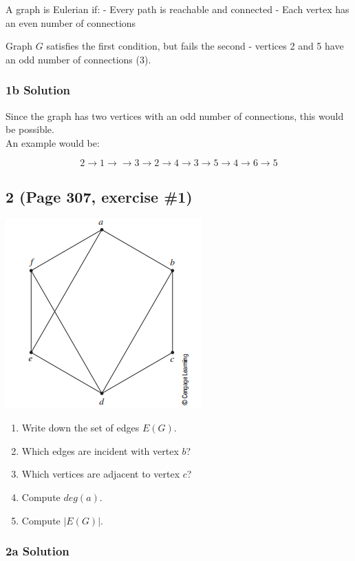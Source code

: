 \documentclass[]{article}
\begin{document}
A graph is Eulerian if: - Every path is reachable and connected - Each
vertex has an even number of connections

Graph \(G\) satisfies the first condition, but fails the second -
vertices 2 and 5 have an odd number of connections (3).

\hypertarget{b-solution}{%
\subsubsection{1b Solution}\label{b-solution}}

Since the graph has two vertices with an odd number of connections, this
would be possible.\\
An example would be:

\[
2 \to 1 \to \to 3 \to 2 \to 4 \to 3 \to 5 \to 4 \to 6 \to 5
\]

\hypertarget{page-307-exercise-1}{%
\subsection{2 (Page 307, exercise \#1)}\label{page-307-exercise-1}}

\includegraphics{figure811.png}

\begin{enumerate}
\def\labelenumi{\alph{enumi}.}
\item
  Write down the set of edges \(E(G)\).
\item
  Which edges are incident with vertex \(b\)?
\item
  Which vertices are adjacent to vertex \(c\)?
\item
  Compute \(deg(a)\).
\item
  Compute \(|E(G)|\).
\end{enumerate}

\hypertarget{a-solution-1}{%
\subsubsection{2a Solution}\label{a-solution-1}}
\end{document}
